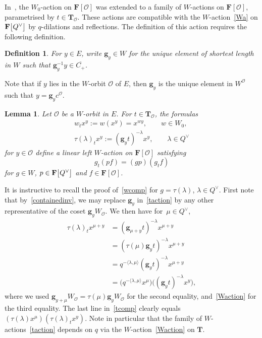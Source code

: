 \documentclass[11pt]{article}
\numberwithin{equation}{section}
\numberwithin{equation}{section}
\newtheorem{Lemma}[Theorem]{Lemma}
\newtheorem{Definition}[Theorem]{Definition}
\begin{document}
In~\cite[Lemma 4.2]{SSV2}, the $W_0$-action on $\mathbf{F}[\mathcal{O}]$ was extended to a family of $W$-actions on $\mathbf{F}[\mathcal{O}]$, parametrised by
$t\in\mathbf{T}_\mathcal{O}$. These actions are compatible with the $W$-action~\eqref{Wa} on $\mathbf{F}\smash{\bigl[Q^\vee\bigr]}$ by $q$-dilations and reflections.
The definition of this action requires the following definition.

\begin{Definition}\label{gy}
For $y\in E$, write $\mathbf{g}_y\in W$ for the unique element of shortest length in $W$ such that $\mathbf{g}_y^{-1}y\in\overline{C_+}$.
\end{Definition}
Note that if $y$ lies in the $W$-orbit $\mathcal{O}$ of $E$,
then $\mathbf{g}_y$ is the unique element in $W^\mathcal{O}$ such that
$y=\mathbf{g}_yc^\mathcal{O}$.
\begin{Lemma}\label{tdefaction}
Let $\mathcal{O}$ be a $W$-orbit in $E$. For $t\in\mathbf{T}_\mathcal{O}$,
 the formulas
\begin{gather}
w_tx^y:=w(x^y)=x^{wy},\qquad w\in W_0, \nonumber\\
\tau(\lambda)_tx^y:=(\mathbf{g}_yt)^{-\lambda}x^y,\qquad \lambda\in Q^\vee\label{taction}
\end{gather}
for $y\in\mathcal{O}$ define a linear left $W$-action on $\mathbf{F}[\mathcal{O}]$
 satisfying
\begin{equation}\label{wcomp}
g_t(pf)=(gp)(g_tf)
\end{equation}
for $g\in W$, $p\in\mathbf{F}\smash{\bigl[Q^\vee\bigr]}$ and $f\in\mathbf{F}[\mathcal{O}]$.
\end{Lemma}
It is instructive to recall the proof of~\eqref{wcomp} for $g=\tau(\lambda)$, $\lambda\in Q^\vee$. First note that by~\eqref{containedinv},
we may replace $\mathbf{g}_y$ in~\eqref{taction} by any other representative of the coset $\mathbf{g}_yW_\mathcal{O}$.
We then have for~${\mu\in Q^\vee}$,
\begin{align}
\tau(\lambda)_tx^{\mu+y}&=(\mathbf{g}_{\mu+y}t)^{-\lambda}x^{\mu+y} \nonumber\\
&=(\tau(\mu)\mathbf{g}_yt)^{-\lambda}x^{\mu+y} \nonumber\\
&=q^{-\langle\lambda,\mu\rangle}(\mathbf{g}_y t)^{-\lambda}x^{\mu+y} \nonumber\\
&=\bigl(q^{-\langle\lambda,\mu\rangle}x^\mu\bigr)\bigl((\mathbf{g}_yt)^{-\lambda}x^y\bigr),\label{tcomp}
\end{align}
where we used $\mathbf{g}_{y+\mu}W_\mathcal{O}=\tau(\mu)\mathbf{g}_yW_\mathcal{O}$ for the second equality, and~\eqref{Waction} for the third equality.
The last line in~\eqref{tcomp} clearly equals $(\tau(\lambda)x^\mu)(\tau(\lambda)_tx^y)$. Note in particular that the family of $W$-actions~\eqref{taction} depends on $q$ via the $W$-action~\eqref{Waction} on $\mathbf{T}$.
\end{document}

